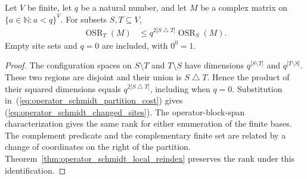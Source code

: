 \begin{theorem}
    \label{thm:operator_schmidt_uniform_partition}
    \leanok
    Let $V$ be finite, let $q$ be a natural number, and let $M$ be a complex
    matrix on $\{a\in\mathbb N:a<q\}^V$. For subsets $S,T\subseteq V$,
    \begin{align}
        \operatorname{OSR}_T(M)
         & \le q^{2|S\mathbin{\triangle}T|}\operatorname{OSR}_S(M).
        \label{eq:operator_schmidt_changed_sites}
    \end{align}
    Empty site sets and $q=0$ are included, with $0^0=1$.
\end{theorem}
\begin{proof}\leanok
    The configuration spaces on $S\setminus T$ and $T\setminus S$ have
    dimensions $q^{|S\setminus T|}$ and $q^{|T\setminus S|}$.
    These two regions are disjoint and their union is
    $S\mathbin{\triangle}T$. Hence the product of their squared dimensions
    equals $q^{2|S\mathbin{\triangle}T|}$, including when $q=0$.
    Substitution in~(\ref{eq:operator_schmidt_partition_cost}) gives
    (\ref{eq:operator_schmidt_changed_sites}). The operator-block-span
    characterization gives the same rank for either enumeration of the
    finite bases.
    The complement predicate and the complementary finite set are related
    by a change of coordinates on the right of the partition.
    Theorem~\ref{thm:operator_schmidt_local_reindex} preserves the rank
    under this identification.
\end{proof}

